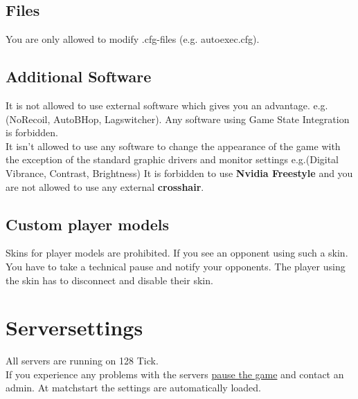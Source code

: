 \documentclass{article}
\begin{document}
\subsection{Files}
You are only allowed to modify .cfg-files (e.g. autoexec.cfg).\\

\subsection{Additional Software}
It is not allowed to use external software which gives you an advantage. e.g.(NoRecoil, AutoBHop, Lagswitcher). Any software using Game State Integration is forbidden.\\
It isn't allowed to use any software to change the appearance of the game with the exception of the standard graphic drivers and monitor settings e.g.(Digital Vibrance, Contrast, Brightness)
It is forbidden to use \textbf{Nvidia Freestyle} and you are not allowed to use any external \textbf{crosshair}.


\subsection{Custom player models}
Skins for player models are prohibited. If you see an opponent using such a skin. You have to take a technical pause and notify your opponents. The player using the skin has to disconnect and disable their skin.


\pagebreak
\section{Serversettings}
All servers are running on 128 Tick.\\
If you experience any problems with the servers \hyperref[sec:pause]{pause the game} and contact an admin. At matchstart the settings are automatically loaded.\\
\end{document}
